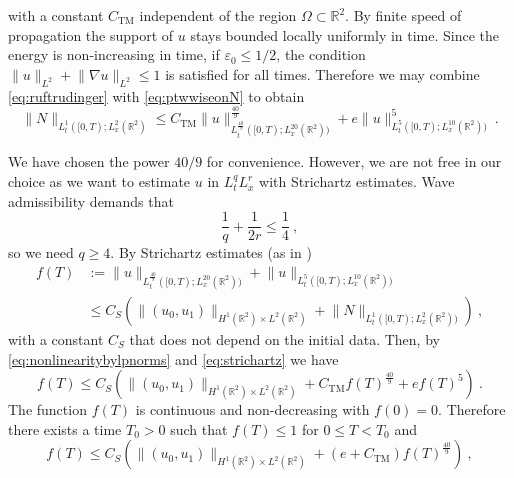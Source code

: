 \documentclass[a4paper]{amsart}
\providecommand{\norm}[1]{\lVert #1 \rVert}
\begin{document}
with a constant $C_{\textrm{TM}}$ independent of the region $\Omega\subset{\mathbb{R}}^2$. By
finite speed of propagation the support of $u$ stays bounded locally
uniformly in time. Since the energy is non-increasing in time, if
${\varepsilon}_0 \leq 1 / 2$, the condition $\norm{u}_{L^{2}} + \norm{\nabla
u}_{L^2} \leq 1$ is satisfied for all times. Therefore we may combine
\eqref{eq:ruftrudinger} with \eqref{eq:ptwwiseonN} to obtain
\begin{equation}
  \label{eq:nonlinearitybylpnorms}
  \lVert N \rVert_{L^1_t([0, T); L^2_x(\mathbb{R}^2)}
  \leq
  C_{\textrm{TM}}
  \norm{u}^{\frac{40}{9}}_{L^{\frac{40}{9}}_t([0,T); L^{20}_x({\mathbb{R}}^2))}
  +
  e
  \norm{u}^{5}_{L^{5}_t([0,T); L^{10}_x({\mathbb{R}}^2))}
  \ .
\end{equation}
\par
We have chosen the power $40/9$ for convenience. However, we are not free in
our choice as we want to estimate $u$ in $L^q_t L^r_x$ with Strichartz
estimates. Wave admissibility \cite{MR1646048} demands that
\begin{equation*}
  \frac{1}{q} + \frac{1}{2 r} \leq \frac{1}{4}\ ,
\end{equation*}
so we need $q \geq 4$. By Strichartz estimates
(as in \cite[Cor. 2.41, Lem. 2.43]{Schlag11})
\begin{equation}
  \label{eq:strichartz}
  \begin{split}
    f(T)
    &:=
    \norm{u}_{L^{\frac{40}{9}}_t([0,T); L^{20}_x({\mathbb{R}}^2))}
    +
    \norm{u}_{L^{5}_t([0,T); L^{10}_x({\mathbb{R}}^2))}
    \\
    &\leq
    C_S
    \left(
      \norm{(u_0,u_1)}_{H^1({\mathbb{R}}^2) \times L^2({\mathbb{R}}^2)}
      +
      \norm{N}_{L^1_t([0,T);L^2_x({\mathbb{R}}^2))}
    \right)
    \ ,
  \end{split}
\end{equation}
with a constant $C_S$ that does not depend on the initial data.
Then, by \eqref{eq:nonlinearitybylpnorms} and \eqref{eq:strichartz} we
have
\begin{equation*}
  f(T)
  \leq
  C_S
  \left(
    \norm{(u_0,u_1)}_{H^1({\mathbb{R}}^2) \times L^2({\mathbb{R}}^2)}
    +
    C_{\textrm{TM}}
    f(T)^{\frac{40}{9}}
    +
    e
    f(T)^{5}
  \right)
  \ .
\end{equation*}
The function $f(T)$ is continuous and non-decreasing with $f(0) = 0$.
Therefore there exists a time $T_0 > 0$ such that $f(T) \leq 1$
for $0 \leq T < T_0$ and
\begin{equation}
  f(T)
  \leq
  C_S
  \left(
    \norm{(u_0,u_1)}_{H^1({\mathbb{R}}^2) \times L^2({\mathbb{R}}^2)}
    +
    (e + C_{\textrm{TM}})
    f(T)^{\frac{40}{9}}
  \right)
  \ ,
  \label{eq:forcinginequality}
\end{equation}
\end{document}
